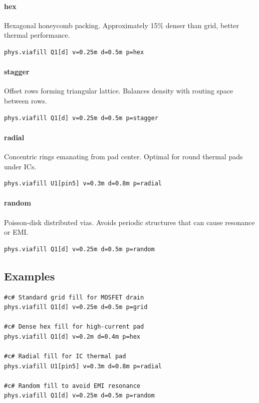 \documentclass{report}
\begin{document}
\paragraph{hex}
Hexagonal honeycomb packing. Approximately 15\% denser than grid, better thermal performance.
\begin{verbatim}
phys.viafill Q1[d] v=0.25m d=0.5m p=hex
\end{verbatim}

\paragraph{stagger}
Offset rows forming triangular lattice. Balances density with routing space between rows.
\begin{verbatim}
phys.viafill Q1[d] v=0.25m d=0.5m p=stagger
\end{verbatim}

\paragraph{radial}
Concentric rings emanating from pad center. Optimal for round thermal pads under ICs.
\begin{verbatim}
phys.viafill U1[pin5] v=0.3m d=0.8m p=radial
\end{verbatim}

\paragraph{random}
Poisson-disk distributed vias. Avoids periodic structures that can cause resonance or EMI.
\begin{verbatim}
phys.viafill Q1[d] v=0.25m d=0.5m p=random
\end{verbatim}

\subsection{Examples}
\begin{verbatim}
#c# Standard grid fill for MOSFET drain
phys.viafill Q1[d] v=0.25m d=0.5m p=grid

#c# Dense hex fill for high-current pad
phys.viafill Q1[d] v=0.2m d=0.4m p=hex

#c# Radial fill for IC thermal pad
phys.viafill U1[pin5] v=0.3m d=0.8m p=radial

#c# Random fill to avoid EMI resonance
phys.viafill Q1[d] v=0.25m d=0.5m p=random
\end{verbatim}
\end{document}
